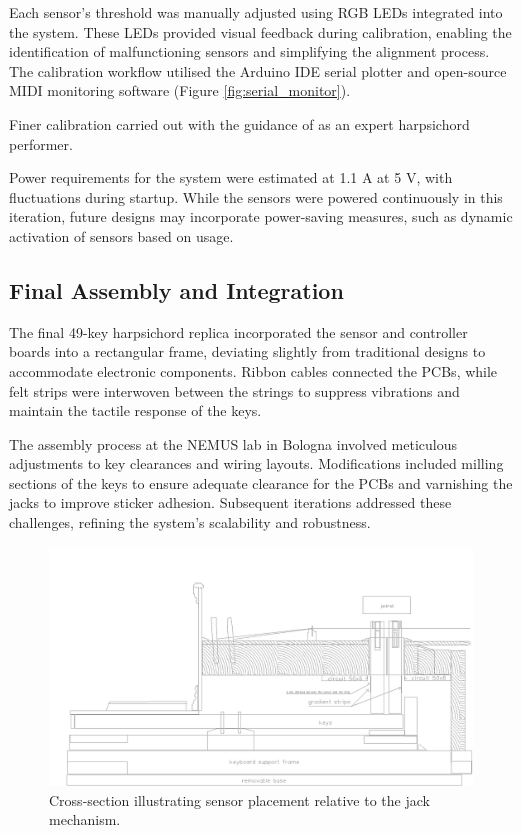 Each sensor's threshold was manually adjusted using RGB LEDs integrated into the system. These LEDs provided visual feedback during calibration, enabling the identification of malfunctioning sensors and simplifying the alignment process. The calibration workflow utilised the Arduino IDE serial plotter and open-source MIDI monitoring software (Figure \ref{fig:serial_monitor}). 


Finer calibration carried out with the guidance of  as an expert harpsichord performer.

Power requirements for the system were estimated at 1.1 A at 5 V, with fluctuations during startup. While the sensors were powered continuously in this iteration, future designs may incorporate power-saving measures, such as dynamic activation of sensors based on usage.

\subsection{Final Assembly and Integration}

The final 49-key harpsichord replica incorporated the sensor and controller boards into a rectangular frame, deviating slightly from traditional designs to accommodate electronic components. Ribbon cables connected the PCBs, while felt strips were interwoven between the strings to suppress vibrations and maintain the tactile response of the keys.

The assembly process at the NEMUS lab in Bologna involved meticulous adjustments to key clearances and wiring layouts. Modifications included milling sections of the keys to ensure adequate clearance for the PCBs and varnishing the jacks to improve sticker adhesion. Subsequent iterations addressed these challenges, refining the system’s scalability and robustness.



\begin{figure}
    \centering
    \includegraphics[width=\linewidth]{src/images/CrossSectionSensorPlacement.jpg}
    \caption{Cross-section illustrating sensor placement relative to the jack mechanism.}
    \label{fig:cross-section}
\end{figure}

